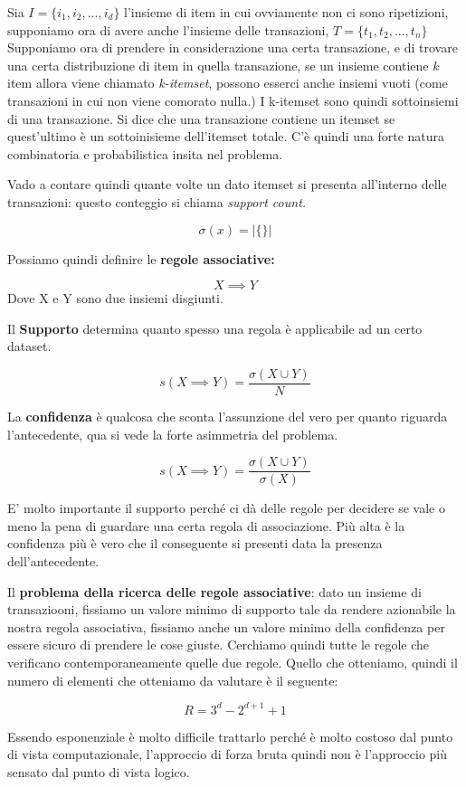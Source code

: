 \documentclass[12pt, a4paper,titlepage,openany]{article}
\begin{document}
Sia $I = \{i_{1}, i_{2}, ..., i_{d}\}$ l'insieme di  item in cui ovviamente non ci sono ripetizioni, supponiamo ora di avere anche l'insieme delle transazioni, $T = \{t_{1}, t_{2}, ..., t_{n}\}$ 
Supponiamo ora di prendere in considerazione una certa transazione, e di trovare una certa distribuzione di item in quella transazione, se un insieme contiene $k$ item allora viene chiamato \textit{k-itemset}, possono esserci anche insiemi vuoti (come transazioni in cui non viene comorato nulla.)  I k-itemset sono quindi sottoinsiemi di una transazione. Si dice che una transazione contiene un itemset se quest'ultimo è un sottoinisieme dell'itemset totale. C'è quindi una forte natura combinatoria e probabilistica insita nel problema.

Vado a contare quindi quante volte un dato itemset si presenta all'interno delle transazioni: questo conteggio si chiama \textit{support count.}


\[ \sigma (x)  = |\{\}|\]

Possiamo quindi definire le \textbf{regole associative:}

\[X  \implies Y\]
Dove X e Y sono due insiemi disgiunti.

Il \textbf{Supporto} determina quanto spesso una regola è applicabile ad un certo dataset.

\[s(X  \implies Y) =  \frac{\sigma(X \cup Y)}{N}\]

La \textbf{confidenza} è qualcosa che sconta l'assunzione del vero per quanto riguarda l'antecedente, qua si vede la forte asimmetria del problema.

\[s(X  \implies Y) =  \frac{\sigma(X \cup Y)}{\sigma(X)}\]

E' molto importante il supporto perché ci dà delle regole per decidere se vale  o meno la pena di guardare una certa regola di associazione.  Più alta è la confidenza più è vero che il conseguente si presenti data la presenza dell'antecedente.

Il \textbf{problema della ricerca delle regole associative}: dato un insieme di transaziooni, fissiamo un valore minimo di supporto tale da rendere azionabile la nostra regola associativa, fissiamo anche un valore minimo della confidenza per essere sicuro di prendere le cose giuste. Cerchiamo quindi tutte le regole che verificano contemporaneamente quelle due regole. Quello che otteniamo, quindi il numero di elementi che otteniamo da valutare è il seguente:

\[R = 3^{d}- 2^{d+1} + 1\]

Essendo esponenziale è molto difficile trattarlo perché è molto costoso dal punto di vista computazionale, l'approccio di forza bruta quindi non è l'approccio più sensato dal punto di vista logico.
\end{document}
